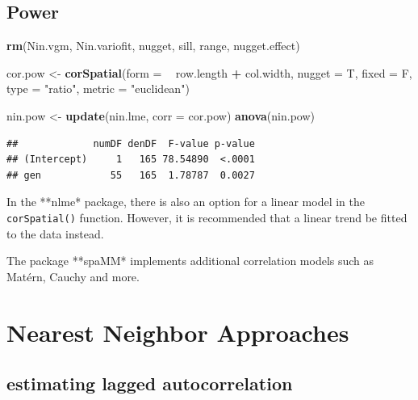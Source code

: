 \documentclass[]{book}
\newenvironment{Shaded}{\begin{snugshade}}{\end{snugshade}}
\newcommand{\DataTypeTok}[1]{\textcolor[rgb]{0.13,0.29,0.53}{#1}}
\newcommand{\KeywordTok}[1]{\textcolor[rgb]{0.13,0.29,0.53}{\textbf{#1}}}
\newcommand{\NormalTok}[1]{#1}
\newcommand{\OperatorTok}[1]{\textcolor[rgb]{0.81,0.36,0.00}{\textbf{#1}}}
\newcommand{\StringTok}[1]{\textcolor[rgb]{0.31,0.60,0.02}{#1}}
\begin{document}
\hypertarget{power}{%
\subsection{Power}\label{power}}

\begin{Shaded}
\begin{Highlighting}[]
\KeywordTok{rm}\NormalTok{(Nin.vgm, Nin.variofit, nugget, sill, range, nugget.effect)}

\NormalTok{cor.pow <-}\StringTok{ }\KeywordTok{corSpatial}\NormalTok{(}\DataTypeTok{form =} \OperatorTok{~}\StringTok{ }\NormalTok{row.length }\OperatorTok{+}\StringTok{ }\NormalTok{col.width, }
                  \DataTypeTok{nugget =}\NormalTok{ T, }\DataTypeTok{fixed =}\NormalTok{ F,}
                  \DataTypeTok{type =} \StringTok{"ratio"}\NormalTok{, }
                  \DataTypeTok{metric =} \StringTok{"euclidean"}\NormalTok{)}

\NormalTok{nin.pow <-}\StringTok{ }\KeywordTok{update}\NormalTok{(nin.lme, }\DataTypeTok{corr =}\NormalTok{ cor.pow)}
\KeywordTok{anova}\NormalTok{(nin.pow)}
\end{Highlighting}
\end{Shaded}

\begin{verbatim}
##             numDF denDF  F-value p-value
## (Intercept)     1   165 78.54890  <.0001
## gen            55   165  1.78787  0.0027
\end{verbatim}

In the **nlme* package, there is also an option for a linear model in the \texttt{corSpatial()} function. However, it is recommended that a linear trend be fitted to the data instead.

The package **spaMM* implements additional correlation models such as Matérn, Cauchy and more.

\hypertarget{nearest-neighbor-approaches-1}{%
\section{Nearest Neighbor Approaches}\label{nearest-neighbor-approaches-1}}

\hypertarget{estimating-lagged-autocorrelation}{%
\subsection{estimating lagged autocorrelation}\label{estimating-lagged-autocorrelation}}
\end{document}
